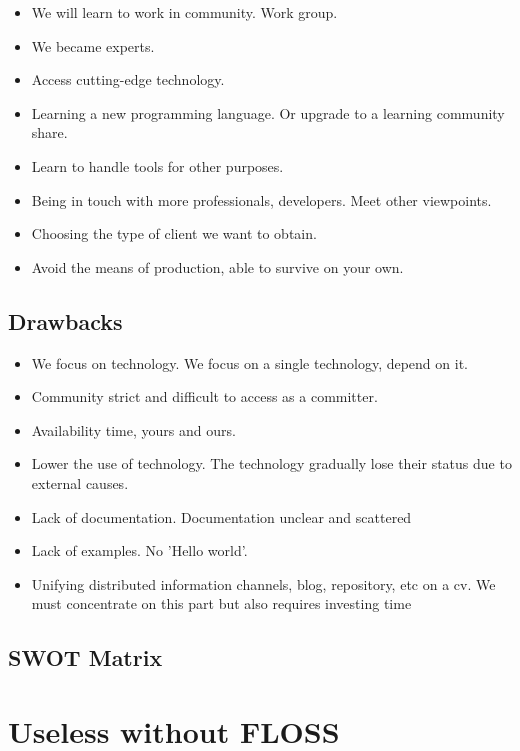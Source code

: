 \documentclass[11pt]{scrartcl}
\begin{document}
\begin{itemize}
    \item We will learn to work in community. Work group.
    \item We became experts.
    \item Access cutting-edge technology.
    \item Learning a new programming language. Or upgrade to a learning community share.
    \item Learn to handle tools for other purposes.
    \item Being in touch with more professionals, developers. Meet other viewpoints.
    \item Choosing the type of client we want to obtain.
    \item Avoid the means of production, able to survive on your own.
\end{itemize}

\subsection{Drawbacks}

\begin{itemize}
    \item We focus on technology. We focus on a single technology, depend on it.
    \item Community strict and difficult to access as a committer.
    \item Availability time, yours and ours. 
    \item Lower the use of technology. The technology gradually lose their status due to external causes.
    \item Lack of documentation. Documentation unclear and scattered
    \item Lack of examples. No 'Hello world'.
    \item Unifying distributed information channels, blog, repository, etc on a cv. We must concentrate on this part but also requires investing time
\end{itemize}

\subsection{SWOT Matrix}

\section{Useless without FLOSS}
\end{document}

